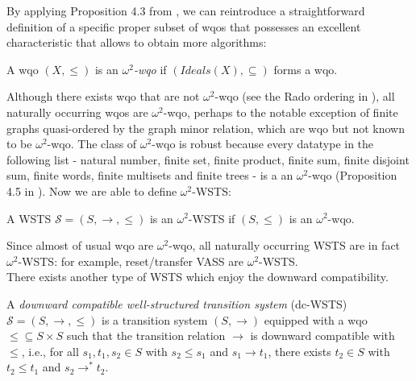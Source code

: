 \documentclass[runningheads]{llncs}
\begin{document}
By applying Proposition 4.3 from \cite{DBLP:journals/corr/abs-1208-4549}, we can reintroduce a straightforward definition of a specific proper subset of wqos that possesses an excellent characteristic that allows to obtain more algorithms: 

\begin{definition}
A wqo $(X, \leq)$ is an \emph{$\omega^2$-wqo} if $(Ideals(X), \subseteq)$ forms a wqo.
\end{definition}


Although there exists wqo that are not $\omega^2$-wqo (see the Rado ordering in \cite{DBLP:journals/ipl/Jancar99}), all naturally occurring wqos are $\omega^2$-wqo, perhaps to the notable exception of ﬁnite graphs quasi-ordered by the graph minor relation, which are wqo but not known to be $\omega^2$-wqo. The class of $\omega^2$-wqo is robust because every datatype in the following list - natural number, finite set, ﬁnite product, ﬁnite sum, finite disjoint sum, ﬁnite words, ﬁnite multisets and ﬁnite trees - is a an $\omega^2$-wqo (Proposition 4.5 in \cite{DBLP:journals/corr/abs-1208-4549}). Now we are able to define $\omega^2$-WSTS:

\begin{definition} \cite{DBLP:journals/corr/abs-1208-4549}
A WSTS  $\mathscr{S}=(S, \rightarrow, \leq)$
is an $\omega^2$-WSTS if $(S, \leq)$ is an $\omega^2$-wqo.
\end{definition}
Since almost of usual wqo are $\omega^2$-wqo, all naturally occurring WSTS are in fact $\omega^2$-WSTS: for example, reset/transfer VASS are $\omega^2$-WSTS.\\

There exists another type of WSTS which enjoy the downward compatibility.

\begin{definition}\cite{DBLP:journals/iandc/Finkel90,DBLP:journals/tcs/FinkelS01}
A {\em downward compatible well-structured transition system} (dc-WSTS)  $\mathscr{S}=(S, \rightarrow, \leq)$
is a transition system $(S, \rightarrow)$
equipped with a wqo ${\leq} \subseteq S \times S$ such that   
the transition relation $ \rightarrow$ is downward compatible with $\leq$, i.e., for all 
$s_1, t_1 , s_2 \in S$
	with $s_2 \leq s_1$  and $s_1 \rightarrow t_1$, there exists 
	$t_2 \in S$ with 
	$t_2 \leq t_1$ and $s_2 \rightarrow^{*} t_2$.
\end{definition}
\end{document}
